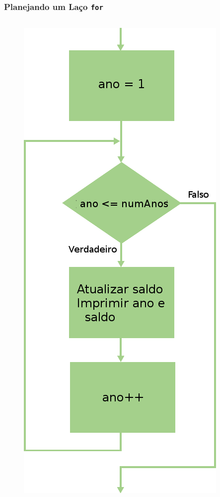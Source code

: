 \documentclass[xcolor={dvipsnames,table},aspectratio=169]{beamer}
\begin{document}
\begin{frame}[fragile]\frametitle{Planejando um Laço \texttt{for}}
\begin{columns}[T]
	\begin{column}{0.3\linewidth}
\begin{figure}[h]
	\includegraphics[height=0.70\paperheight,center]{pucrs-ep-fprog-unidade_04-lacos-laminas-fluxograma_laco_for.png}

\end{figure}
\end{column}
\end{columns}
\end{frame}
\end{document}
